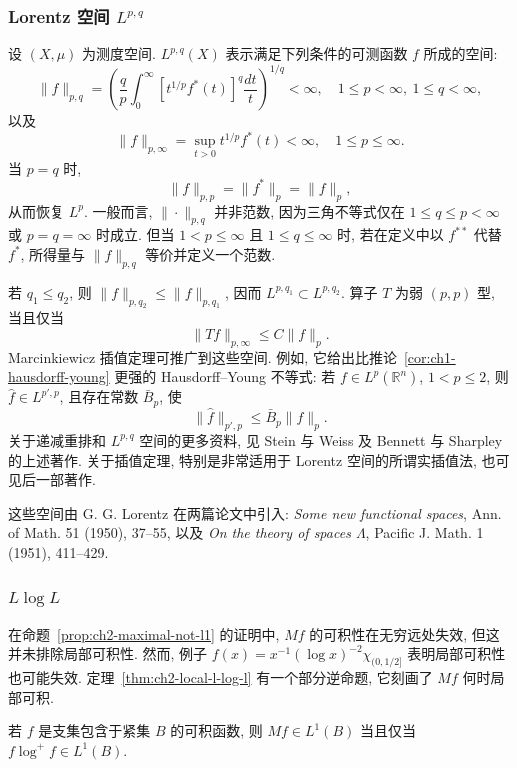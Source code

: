 \subsubsection{Lorentz 空间 $L^{p,q}$}
\label{subsec:ch2-lorentz-spaces}
设 $(X,\mu)$ 为测度空间. $L^{p,q}(X)$ 表示满足下列条件的可测函数 $f$ 所成的空间:
\[
 \|f\|_{p,q}=\left(\frac qp\int_0^\infty[t^{1/p}f^*(t)]^q\frac{dt}{t}\right)^{1/q}<\infty,
 \quad 1\le p<\infty,\ 1\le q<\infty,
\]
以及
\[
 \|f\|_{p,\infty}=\sup_{t>0}t^{1/p}f^*(t)<\infty,
 \quad 1\le p\le\infty.
\]
当 $p=q$ 时,
\[
 \|f\|_{p,p}=\|f^*\|_p=\|f\|_p,
\]
从而恢复 $L^p$. 一般而言, $\|\cdot\|_{p,q}$ 并非范数, 因为三角不等式仅在 $1\le q\le p<\infty$ 或 $p=q=\infty$ 时成立. 但当 $1<p\le\infty$ 且 $1\le q\le\infty$ 时, 若在定义中以 $f^{**}$ 代替 $f^*$, 所得量与 $\|f\|_{p,q}$ 等价并定义一个范数.

若 $q_1\le q_2$, 则 $\|f\|_{p,q_2}\le\|f\|_{p,q_1}$, 因而 $L^{p,q_1}\subset L^{p,q_2}$. 算子 $T$ 为弱 $(p,p)$ 型, 当且仅当
\[
 \|Tf\|_{p,\infty}\le C\|f\|_p.
\]
Marcinkiewicz 插值定理可推广到这些空间. 例如, 它给出比推论~\ref{cor:ch1-hausdorff-young} 更强的 Hausdorff--Young 不等式: 若 $f\in L^p(\mathbb R^n)$, $1<p\le2$, 则 $\widehat f\in L^{p',p}$, 且存在常数 $\bar B_p$, 使
\[
 \|\widehat f\|_{p',p}\le \bar B_p\|f\|_p.
\]
关于递减重排和 $L^{p,q}$ 空间的更多资料, 见 Stein 与 Weiss  及 Bennett 与 Sharpley 的上述著作. 关于插值定理, 特别是非常适用于 Lorentz 空间的所谓实插值法, 也可见后一部著作.

\hypertarget{chapter-02-page-054}{}
这些空间由 G. G. Lorentz 在两篇论文中引入: \emph{Some new functional spaces}, Ann. of Math. 51 (1950), 37--55, 以及 \emph{On the theory of spaces $\Lambda$}, Pacific J. Math. 1 (1951), 411--429.

\subsubsection{$L\log L$}
\label{subsec:ch2-l-log-l}
在命题~\ref{prop:ch2-maximal-not-l1} 的证明中, $Mf$ 的可积性在无穷远处失效, 但这并未排除局部可积性. 然而, 例子 $f(x)=x^{-1}(\log x)^{-2}\chi_{(0,1/2]}$ 表明局部可积性也可能失效. 定理~\ref{thm:ch2-local-l-log-l} 有一个部分逆命题, 它刻画了 $Mf$ 何时局部可积.

\begin{Theorem}
\label{thm:ch2-l-log-l-characterization}
若 $f$ 是支集包含于紧集 $B$ 的可积函数, 则 $Mf\in L^1(B)$ 当且仅当 $f\log^+f\in L^1(B)$.
\end{Theorem}

